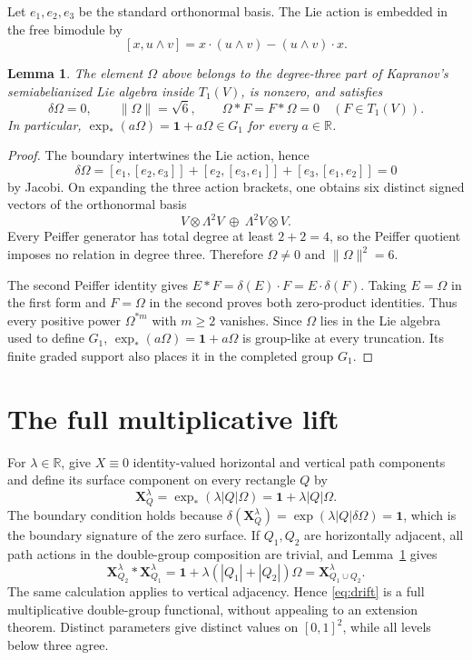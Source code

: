 \documentclass[11pt]{article}
\newtheorem{lemma}{Lemma}
\theoremstyle{remark}
\newcommand{\V}{V}
\newcommand{\one}{\mathbf 1}
\begin{document}
Let $e_1,e_2,e_3$ be the standard orthonormal basis.  The Lie action is
embedded in the free bimodule by
\[
 [x,u\wedge v]=x\cdot(u\wedge v)-(u\wedge v)\cdot x.
\]

\begin{lemma}\label{lem:omega}
The element $\Omega$ above belongs to the degree-three part of Kapranov's
semiabelianized Lie algebra inside $T_1(\V)$, is nonzero, and satisfies
\[
 \delta\Omega=0,\qquad \|\Omega\|=\sqrt6,
 \qquad \Omega*F=F*\Omega=0\quad(F\in T_1(\V)).
\]
In particular, $\exp_*(a\Omega)=\one+a\Omega\in G_1$ for every $a\in\mathbb R$.
\end{lemma}

\begin{proof}
The boundary intertwines the Lie action, hence
\[
 \delta\Omega=[e_1,[e_2,e_3]]+[e_2,[e_3,e_1]]
                 +[e_3,[e_1,e_2]]=0
\]
by Jacobi.  On expanding the three action brackets, one obtains six distinct
signed vectors of the orthonormal basis
\[
 \V\otimes\Lambda^2\V\ \oplus\ \Lambda^2\V\otimes\V.
\]
Every Peiffer generator has total degree at least $2+2=4$, so the Peiffer
quotient imposes no relation in degree three.  Therefore $\Omega\ne0$ and
$\|\Omega\|^2=6$.

The second Peiffer identity gives
$E*F=\delta(E)\cdot F=E\cdot\delta(F)$.  Taking $E=\Omega$ in the first
form and $F=\Omega$ in the second proves both zero-product identities.
Thus every positive power $\Omega^{*m}$ with $m\ge2$ vanishes.  Since
$\Omega$ lies in the Lie algebra used to define $G_1$,
$\exp_*(a\Omega)=\one+a\Omega$ is group-like at every truncation.  Its
finite graded support also places it in the completed group $G_1$.
\end{proof}

\section{The full multiplicative lift}

For $\lambda\in\mathbb R$, give $X\equiv0$ identity-valued horizontal and
vertical path components and define its surface component on every rectangle
$Q$ by
\begin{equation}\label{eq:drift}
 \mathbf X_Q^\lambda
 =\exp_*(\lambda|Q|\Omega)
 =\one+\lambda|Q|\Omega.
\end{equation}
The boundary condition holds because
$\delta(\mathbf X_Q^\lambda)=\exp(\lambda|Q|\delta\Omega)=\one$, which is
the boundary signature of the zero surface.  If $Q_1,Q_2$ are horizontally
adjacent, all path actions in the double-group composition are trivial, and
Lemma~\ref{lem:omega} gives
\[
 \mathbf X_{Q_2}^\lambda*\mathbf X_{Q_1}^\lambda
 =\one+\lambda(|Q_1|+|Q_2|)\Omega
 =\mathbf X_{Q_1\cup Q_2}^\lambda.
\]
The same calculation applies to vertical adjacency.  Hence
\eqref{eq:drift} is a full multiplicative double-group functional, without
appealing to an extension theorem.  Distinct parameters give distinct values
on $[0,1]^2$, while all levels below three agree.
\end{document}
